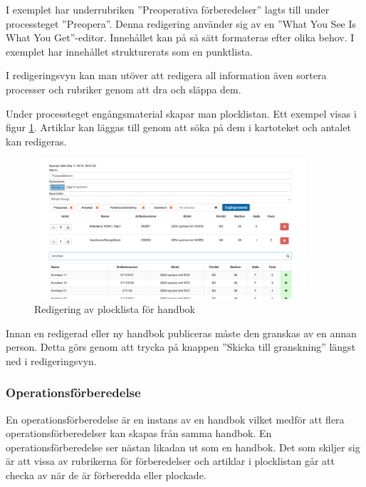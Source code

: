 I exemplet har underrubriken ''Preoperativa förberedelser'' lagts till under processteget ''Preopera''. Denna redigering använder sig av en ''What You See Is What You Get''-editor. Innehållet kan på så sätt formateras efter olika behov. I exemplet har innehållet strukturerats som en punktlista. 

I redigeringsvyn kan man utöver att redigera all information även sortera processer och rubriker genom att dra och släppa dem.

Under processteget engångsmaterial skapar man plocklistan. Ett exempel visas i figur \ref{fig:plocklistaredigering2}. Artiklar kan läggas till genom att söka på dem i kartoteket och antalet kan redigeras.

\begin{figure}[h!]
  \centering
  \includegraphics[width=0.9\textwidth]{images/site/plocklistaredigering2}
  \caption{Redigering av plocklista för handbok}
  \label{fig:plocklistaredigering2}
\end{figure}


Innan en redigerad eller ny handbok publiceras måste den granskas av en annan person. Detta görs genom att trycka på knappen ''Skicka till granskning'' längst ned i redigeringsvyn.

\subsubsection{Operationsförberedelse}
En operationsförberedelse är en instans av en handbok vilket medför att flera operationsförberedelser kan skapas från samma handbok. En operationsförberedelse ser nästan likadan ut som en handbok.
Det som skiljer sig är att vissa av rubrikerna för förberedelser och artiklar i plocklistan går att checka av när de är förberedda eller plockade.

